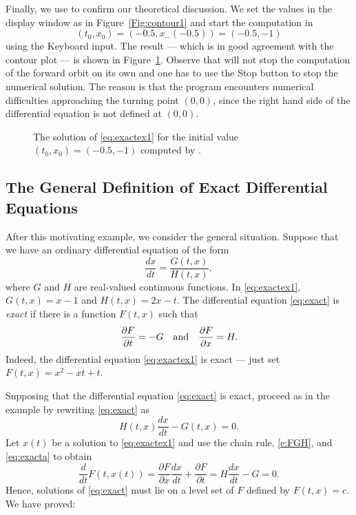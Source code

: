 \documentclass{ximera}
\begin{document}
Finally, we use {\dfield} to confirm our 
theoretical discussion.  We set the values in {\sf the display window}
as in Figure~\ref{Fig:contour1} and start the computation in 
\[
(t_0,x_0)=(-0.5,x_-(-0.5))=(-0.5,-1)
\]
using the {\sf Keyboard input}.  The result --- which is in good
agreement with the contour plot --- is shown in
Figure~\ref{Fig:contour2}.  Observe that {\dfield} will not 
stop the computation of the forward orbit on its own and one has to
use the {\sf Stop} button to stop the numerical solution.  The reason is
that the program encounters numerical difficulties approaching the turning
point $(0,0)$, since the right hand side of the differential equation is
not defined at $(0,0)$.

\begin{figure}[htb]
  \centerline{%
  }
  \caption{The solution of \protect\eqref{eq:exactex1} for the
  initial value $(t_0,x_0)=(-0.5,-1)$ computed by {\dfield}.}
  \label{Fig:contour2}
\end{figure}

\subsection*{The General Definition of Exact Differential Equations}

After this motivating example, we consider the general
situation.  Suppose that we have an ordinary differential
equation of the form
\begin{equation} \label{eq:exact}
\frac{dx}{dt} = \frac{G(t,x)}{H(t,x)},
\end{equation}
where $G$ and $H$ are real-valued continuous functions.  In 
\eqref{eq:exactex1}, $G(t,x)=x-1$ and $H(t,x) = 2x-t$.
The differential equation \eqref{eq:exact} is {\em exact\/} 
 if
there is a function $F(t,x)$ such that
\begin{equation}  \label{e:FGH}
\frac{\partial F}{\partial t} = -G \quad\mbox{and}\quad
\frac{\partial F}{\partial x} =  H.
\end{equation}
Indeed, the differential equation \eqref{eq:exactex1} is exact --- just set 
$F(t,x) = x^2 - xt + t$.

Supposing that the differential equation \eqref{eq:exact} is exact, proceed as 
in the example by rewriting \eqref{eq:exact} as 
\begin{equation} \label{eq:exacta}
H(t,x)\frac{dx}{dt} - G(t,x) = 0.
\end{equation}
Let $x(t)$ be a solution to \eqref{eq:exactex1} and use the chain rule, 
\eqref{e:FGH}, and \eqref{eq:exacta} to obtain
\[
\frac{d}{dt} F(t,x(t)) = \frac{\partial F}{\partial x}\frac{dx}{dt} + 
\frac{\partial F}{\partial t} = H\frac{dx}{dt}-G = 0.
\]
Hence, solutions of \eqref{eq:exact} must lie on a level set of $F$ defined 
by $F(t,x) = c$. We have proved:
\end{document}
